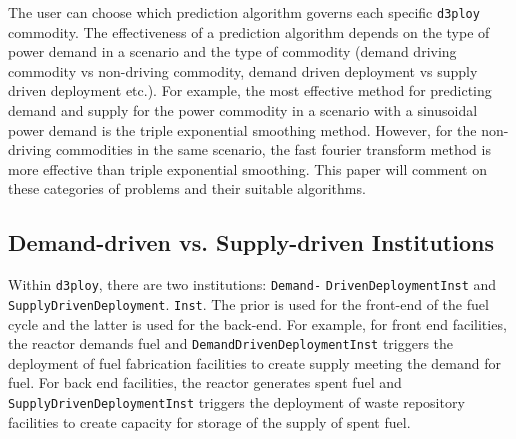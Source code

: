 \documentclass[11pt,letterpaper]{article}
\newcommand{\deploy}{\texttt{d3ploy}\xspace}%
\begin{document}
The user can choose which prediction algorithm governs each specific 
\deploy commodity. 
The effectiveness of a prediction algorithm depends on the type 
of power demand in a scenario and the type of commodity (demand 
driving commodity vs non-driving commodity, demand driven 
deployment vs supply driven deployment etc.). 
For example, the most effective method
for predicting demand and supply for the power commodity in a scenario  
with a sinusoidal power demand is the triple exponential smoothing method. 
However, for the non-driving commodities in the same 
scenario, the fast fourier transform method is more effective than triple 
exponential smoothing. 
This paper will comment on these categories of problems and their suitable
algorithms. 

\subsection{\textbf{Demand-driven vs. Supply-driven Institutions}}
Within \deploy, there are two institutions: \texttt{Demand-}
\texttt{DrivenDeploymentInst} and \texttt{SupplyDrivenDeployment}. 
\texttt{Inst}. 
The prior is used for the front-end of the fuel cycle and the latter is used 
for the back-end. 
For example, for front end facilities, the reactor demands 
fuel and \texttt{DemandDrivenDeploymentInst} triggers the deployment 
of fuel fabrication facilities to create supply meeting the demand 
for fuel. 
For back end facilities, the reactor generates spent fuel 
and \texttt{SupplyDrivenDeploymentInst} triggers the deployment of 
waste repository facilities to create capacity for storage of the supply 
of spent fuel. 
\end{document}

